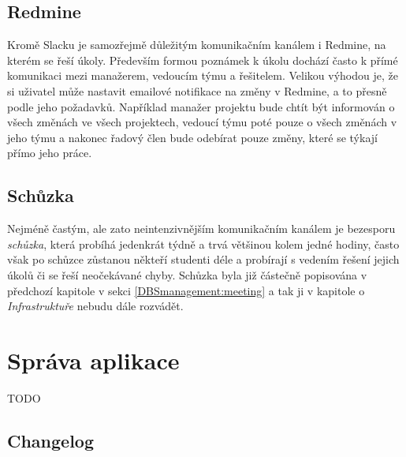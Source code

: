 \subsection{Redmine}

Kromě Slacku je samozřejmě důležitým komunikačním kanálem i Redmine, na kterém se řeší úkoly. Především formou poznámek k úkolu dochází často k přímé komunikaci mezi manažerem, vedoucím týmu a řešitelem. Velikou výhodou je, že si uživatel může nastavit emailové notifikace na změny v Redmine, a to přesně podle jeho požadavků. Například manažer projektu bude chtít být informován o všech změnách ve všech projektech, vedoucí týmu poté pouze o všech změnách v jeho týmu a nakonec řadový člen bude odebírat pouze změny, které se týkají přímo jeho práce.

\subsection{Schůzka}

Nejméně častým, ale zato neintenzivnějším komunikačním kanálem je bezesporu \emph{schůzka}, která probíhá jedenkrát týdně a trvá většinou kolem jedné hodiny, často však po schůzce zůstanou někteří studenti déle a probírají s vedením řešení jejich úkolů či se řeší neočekávané chyby. Schůzka byla již částečně popisována v předchozí kapitole v sekci \ref{DBSmanagement:meeting} a tak ji v kapitole o \emph{Infrastruktuře} nebudu dále rozvádět.


\section{Správa aplikace}

TODO

\subsection{Changelog}

